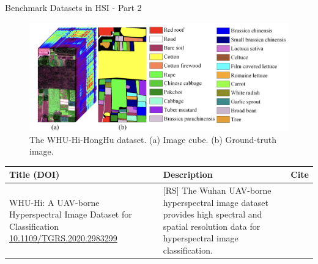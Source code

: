 \documentclass[10pt,svgnames,fragile]{beamer}
\begin{document}
\begin{frame}{Benchmark Datasets in HSI - Part 2}
\small
\begin{figure}
    \centering
    \includegraphics[width=0.62\linewidth]{WHU-Hi.png}
    \caption{The WHU-Hi-HongHu dataset. (a) Image cube. (b) Ground-truth image.\cite{huWHUHiUAVborneHyperspectral}}
    \label{fig:WHU-Hi}
\end{figure}
\vspace{-1cm} %
\begin{table}[]
    \centering
    \begin{tabular}{|p{4.5cm}|p{6cm}|p{0.5cm}|}
        \hline
        \textbf{Title (DOI)} & \textbf{Description} & \textbf{Cite} \\ \hline
        WHU-Hi: A UAV-borne Hyperspectral Image Dataset for Classification \newline \href{https://consensus.app/papers/whuhi-uavborne-resolution-benchmark-datasets-image-hu/c738ddb273815adda3d8fadfcd4f0192/?utm_source=chatgpt}{\color{blue}10.1109/TGRS.2020.2983299} & [RS] The Wuhan UAV-borne hyperspectral image dataset provides high spectral and spatial resolution data for hyperspectral image classification. & \cite{huWHUHiUAVborneHyperspectral} \\ \hline
    \end{tabular}
\end{table}
\end{frame}
\end{document}
